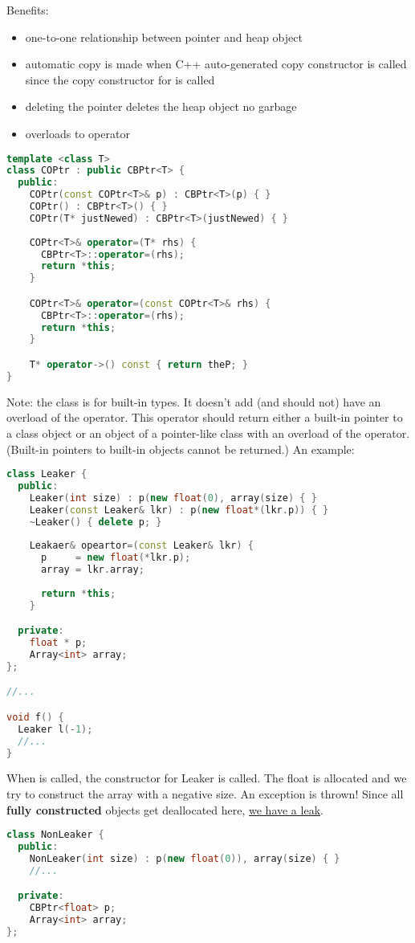 Benefits:

\begin{itemize}
  \item one-to-one relationship between pointer and heap object
  \item automatic copy is made when C++ auto-generated copy constructor is called since the copy constructor for  is called
  \item deleting the pointer deletes the heap object \textrightarrow no garbage
  \item overloads to \cpp{*} operator
\end{itemize}

\begin{lstlisting}[language=C++]
template <class T>
class COPtr : public CBPtr<T> {
  public:
    COPtr(const COPtr<T>& p) : CBPtr<T>(p) { }
    COPtr() : CBPtr<T>() { }
    COPtr(T* justNewed) : CBPtr<T>(justNewed) { }
    
    COPtr<T>& operator=(T* rhs) {
      CBPtr<T>::operator=(rhs);
      return *this;
    }

    COPtr<T>& operator=(const COPtr<T>& rhs) {
      CBPtr<T>::operator=(rhs);
      return *this;
    }

    T* operator->() const { return theP; }
}
\end{lstlisting}

Note: the  class is for built-in types. It doesn't add (and should not) have an overload of the \cpp{->} operator. This operator should return either a built-in pointer to a class object or an object of a pointer-like class with an overload of the \cpp{->} operator. (Built-in pointers to built-in objects cannot be returned.) An example:

\begin{lstlisting}[language=C++]
class Leaker {
  public:
    Leaker(int size) : p(new float(0), array(size) { }
    Leaker(const Leaker& lkr) : p(new float*(lkr.p)) { }
    ~Leaker() { delete p; }
    
    Leakaer& opeartor=(const Leaker& lkr) {
      p     = new float(*lkr.p);
      array = lkr.array;
      
      return *this;
    }

  private:
    float * p;
    Array<int> array; 
};

//...

void f() {
  Leaker l(-1);
  //...
}
\end{lstlisting}

When  is called, the constructor for Leaker is called. The float is allocated and we try to construct the array with a negative size. An exception is thrown! Since all \textbf{fully constructed} objects get deallocated here, \underline{we have a leak}.

\begin{lstlisting}[language=C++]
class NonLeaker {
  public:
    NonLeaker(int size) : p(new float(0)), array(size) { }
    //...

  private:
    CBPtr<float> p;
    Array<int> array;
};
\end{lstlisting}
